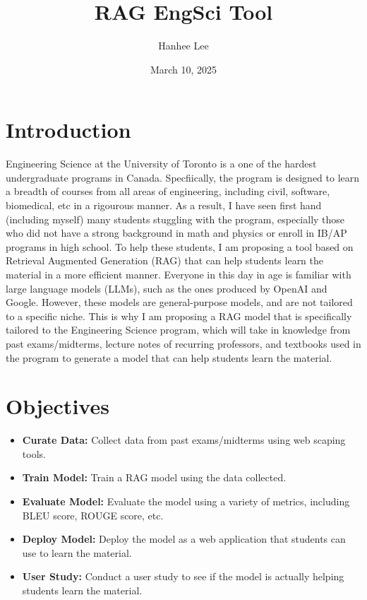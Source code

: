 \documentclass{article}
\begin{document}
\title{RAG EngSci Tool}
\author{Hanhee Lee}
\date{March 10, 2025}
\maketitle  

\section{Introduction}
Engineering Science at the University of Toronto is a one of the hardest undergraduate programs in Canada. 
Specfiically, the program is designed to learn a breadth of courses from all areas of engineering, including civil, software, biomedical, etc in a rigourous manner. 
As a result, I have seen first hand (including myself) many students stuggling with the program, especially those who did not have a strong background in math and physics or enroll in IB/AP programs in high school. 
To help these students, I am proposing a tool based on Retrieval Augmented Generation (RAG) that can help students learn the material in a more efficient manner. Everyone in this day in age is familiar with large language models (LLMs), such as the ones produced by OpenAI and Google. 
However, these models are general-purpose models, and are not tailored to a specific niche. This is why I am proposing a RAG model that is specifically tailored to the Engineering Science program, which will take in knowledge from past exams/midterms, lecture notes of recurring professors, and textbooks used in the program to generate a model that can help students learn the material. 

\section{Objectives}
\begin{itemize}
    \item \textbf{Curate Data:} Collect data from past exams/midterms using web scaping tools. 
    \item \textbf{Train Model:} Train a RAG model using the data collected.
    \item \textbf{Evaluate Model:} Evaluate the model using a variety of metrics, including BLEU score, ROUGE score, etc.
    \item \textbf{Deploy Model:} Deploy the model as a web application that students can use to learn the material.
    \item \textbf{User Study:} Conduct a user study to see if the model is actually helping students learn the material.
\end{itemize}
\end{document}
